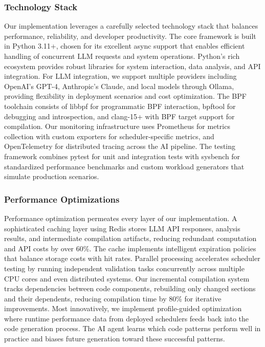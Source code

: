 \subsubsection{Technology Stack}
Our implementation leverages a carefully selected technology stack that balances performance, reliability, and developer productivity. The core framework is built in Python 3.11+, chosen for its excellent async support that enables efficient handling of concurrent LLM requests and system operations. Python's rich ecosystem provides robust libraries for system interaction, data analysis, and API integration. For LLM integration, we support multiple providers including OpenAI's GPT-4, Anthropic's Claude, and local models through Ollama, providing flexibility in deployment scenarios and cost optimization. The BPF toolchain consists of libbpf for programmatic BPF interaction, bpftool for debugging and introspection, and clang-15+ with BPF target support for compilation. Our monitoring infrastructure uses Prometheus for metrics collection with custom exporters for scheduler-specific metrics, and OpenTelemetry for distributed tracing across the AI pipeline. The testing framework combines pytest for unit and integration tests with sysbench for standardized performance benchmarks and custom workload generators that simulate production scenarios.

\subsubsection{Performance Optimizations}
Performance optimization permeates every layer of our implementation. A sophisticated caching layer using Redis stores LLM API responses, analysis results, and intermediate compilation artifacts, reducing redundant computation and API costs by over 60\%. The cache implements intelligent expiration policies that balance storage costs with hit rates. Parallel processing accelerates scheduler testing by running independent validation tasks concurrently across multiple CPU cores and even distributed systems. Our incremental compilation system tracks dependencies between code components, rebuilding only changed sections and their dependents, reducing compilation time by 80\% for iterative improvements. Most innovatively, we implement profile-guided optimization where runtime performance data from deployed schedulers feeds back into the code generation process. The AI agent learns which code patterns perform well in practice and biases future generation toward these successful patterns.

